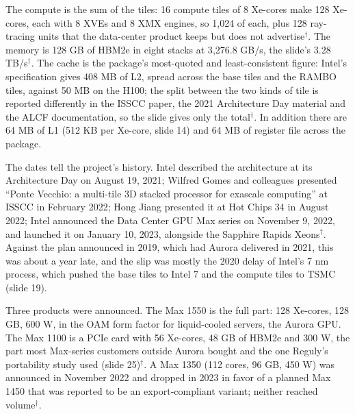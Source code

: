 \documentclass[11pt,letterpaper]{article}
\begin{document}
The compute is the sum of the tiles: 16 compute tiles of 8 Xe-cores make 128 Xe-cores, each with 8 XVEs and 8 XMX engines, so 1{,}024 of each, plus 128 ray-tracing units that the data-center product keeps but does not advertise$^\dagger$. The memory is 128 GB of HBM2e in eight stacks at 3{,}276.8 GB/s, the slide's 3.28 TB/s$^\dagger$. The cache is the package's most-quoted and least-consistent figure: Intel's specification gives 408 MB of L2, spread across the base tiles and the RAMBO tiles, against 50 MB on the H100; the split between the two kinds of tile is reported differently in the ISSCC paper, the 2021 Architecture Day material and the ALCF documentation, so the slide gives only the total$^\dagger$. In addition there are 64 MB of L1 (512 KB per Xe-core, slide 14) and 64 MB of register file across the package.

The dates tell the project's history. Intel described the architecture at its Architecture Day on August 19, 2021; Wilfred Gomes and colleagues presented ``Ponte Vecchio: a multi-tile 3D stacked processor for exascale computing'' at ISSCC in February 2022; Hong Jiang presented it at Hot Chips 34 in August 2022; Intel announced the Data Center GPU Max series on November 9, 2022, and launched it on January 10, 2023, alongside the Sapphire Rapids Xeons$^\dagger$. Against the plan announced in 2019, which had Aurora delivered in 2021, this was about a year late, and the slip was mostly the 2020 delay of Intel's 7 nm process, which pushed the base tiles to Intel 7 and the compute tiles to TSMC (slide 19).

Three products were announced. The Max 1550 is the full part: 128 Xe-cores, 128 GB, 600 W, in the OAM form factor for liquid-cooled servers, the Aurora GPU. The Max 1100 is a PCIe card with 56 Xe-cores, 48 GB of HBM2e and 300 W, the part most Max-series customers outside Aurora bought and the one Reguly's portability study used (slide 25)$^\dagger$. A Max 1350 (112 cores, 96 GB, 450 W) was announced in November 2022 and dropped in 2023 in favor of a planned Max 1450 that was reported to be an export-compliant variant; neither reached volume$^\dagger$.
\end{document}
